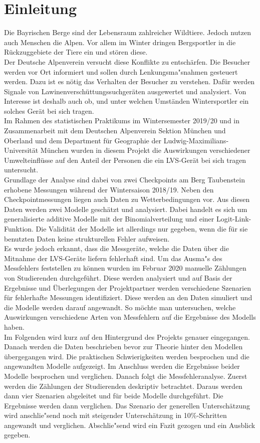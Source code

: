 \documentclass[12pt]{scrreprt}
\begin{document}
\chapter{Einleitung}
Die Bayrischen Berge sind der Lebensraum zahlreicher Wildtiere. Jedoch nutzen auch Menschen die Alpen. Vor allem im Winter dringen Bergsportler in die Rückzuggebiete der Tiere ein und stören diese. \\
Der Deutsche Alpenverein versucht diese Konflikte zu entschärfen. Die Besucher werden vor Ort informiert und sollen durch Lenkungsma"snahmen gesteuert werden. Dazu ist es nötig das Verhalten der Besucher zu verstehen. Dafür werden Signale von Lawinenverschüttungssuchgeräten ausgewertet und analysiert. Von Interesse ist deshalb auch ob, und unter welchen Umständen Wintersportler ein solches Gerät bei sich tragen. \\
Im Rahmen des statistischen Praktikums im Wintersemester 2019/20 und in Zusammenarbeit mit dem Deutschen Alpenverein Sektion München und Oberland und dem Department für Geographie der Ludwig-Maximilians-Universität München wurden in diesem Projekt die Auswirkungen verschiedener Umwelteinflüsse auf den Anteil der Personen die ein LVS-Gerät bei sich tragen untersucht. \\
Grundlage der Analyse sind dabei von zwei Checkpoints am Berg Taubenstein erhobene Messungen während der Wintersaison 2018/19. Neben den Checkpointmessungen liegen auch Daten zu Wetterbedingungen vor. Aus diesen Daten werden zwei Modelle geschätzt und analysiert. Dabei handelt es sich um generalisierte additive Modelle mit der Binomialverteilung und einer Logit-Link-Funktion. Die Validität der Modelle ist allerdings nur gegeben, wenn die für sie benutzten Daten keine strukturellen Fehler aufweisen. \\
Es wurde jedoch erkannt, dass die Messgeräte, welche die Daten über die Mitnahme der LVS-Geräte liefern fehlerhaft sind. Um das Ausma"s des Messfehlers feststellen zu können wurden im Februar 2020 manuelle Zählungen von Studierenden durchgeführt. Diese werden analysiert und auf Basis der Ergebnisse und Überlegungen der Projektpartner werden verschiedene Szenarien für fehlerhafte Messungen identifiziert. Diese werden an den Daten simuliert und die Modelle werden darauf angewandt. So möchte man untersuchen, welche Auswirkungen verschiedene Arten von Messfehlern auf die Ergebnisse des Modells haben. \\
Im Folgenden wird kurz auf den Hintergrund des Projekts genauer eingegangen. Danach werden die Daten beschrieben bevor zur Theorie hinter den Modellen übergegangen wird. Die praktischen Schwierigkeiten werden besprochen und die angewandten Modelle aufgezeigt. Im Anschluss werden die Ergebnisse beider Modelle besprochen und verglichen. Danach folgt die Messfehleranalyse. Zuerst werden die Zählungen der Studierenden deskriptiv betrachtet. Daraus werden dann vier Szenarien abgeleitet und für beide Modelle durchgeführt. Die Ergebnisse werden dann verglichen. Das Szenario der generellen Unterschätzung wird anschlie"send noch mit steigender Unterschätzung in 10\%-Schritten angewandt und verglichen. Abschlie"send wird ein Fazit gezogen und ein Ausblick gegeben.
\end{document}
